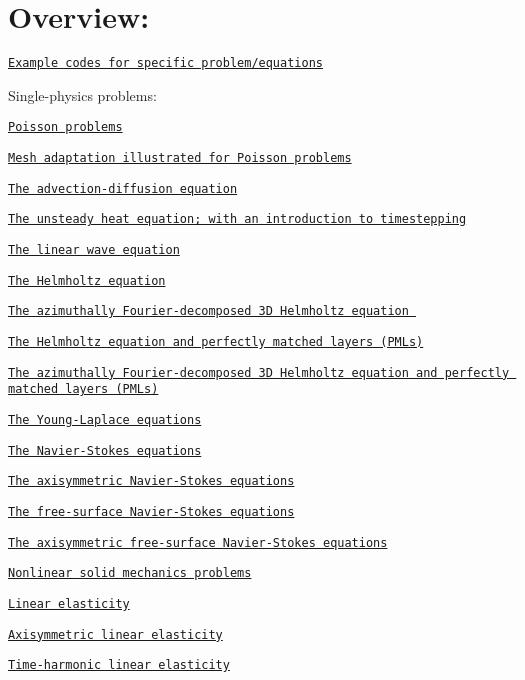 \section*{Overview\+:}


\begin{DoxyEnumerate}
\item \href{#problems}{\tt Example codes for specific problem/equations}
\begin{DoxyItemize}
\item Single-\/physics problems\+:
\begin{DoxyItemize}
\item \href{#poisson}{\tt Poisson problems}
\item \href{#poisson_adapt}{\tt Mesh adaptation illustrated for Poisson problems}
\item \href{#adv_diff}{\tt The advection-\/diffusion equation}
\item \href{#unsteady_heat}{\tt The unsteady heat equation; with an introduction to timestepping}
\item \href{#wave}{\tt The linear wave equation}
\item \href{#helmholtz}{\tt The Helmholtz equation}
\item \href{#fourier_decomposed_helmholtz}{\tt The azimuthally Fourier-\/decomposed 3D Helmholtz equation }
\item \href{#pml_helmholtz}{\tt The Helmholtz equation and perfectly matched layers (P\+M\+Ls)}
\item \href{#pml_fourier_decomposed_helmholtz}{\tt The azimuthally Fourier-\/decomposed 3D Helmholtz equation and perfectly matched layers (P\+M\+Ls)}
\item \href{#young_laplace}{\tt The Young-\/\+Laplace equations}
\item \href{#nst}{\tt The Navier-\/\+Stokes equations}
\item \href{#axisym_nst}{\tt The axisymmetric Navier-\/\+Stokes equations}
\item \href{#free_surface_nst}{\tt The free-\/surface Navier-\/\+Stokes equations}
\item \href{#axi_free_surface_nst}{\tt The axisymmetric free-\/surface Navier-\/\+Stokes equations}
\item \href{#solid}{\tt Nonlinear solid mechanics problems}
\item \href{#linear_elasticity}{\tt Linear elasticity}
\item \href{#axisym_linear_elasticity}{\tt Axisymmetric linear elasticity}
\item \href{#time_harmonic_lin_elas}{\tt Time-\/harmonic linear elasticity}

\end{DoxyItemize}
\end{DoxyItemize}
\end{DoxyEnumerate}
